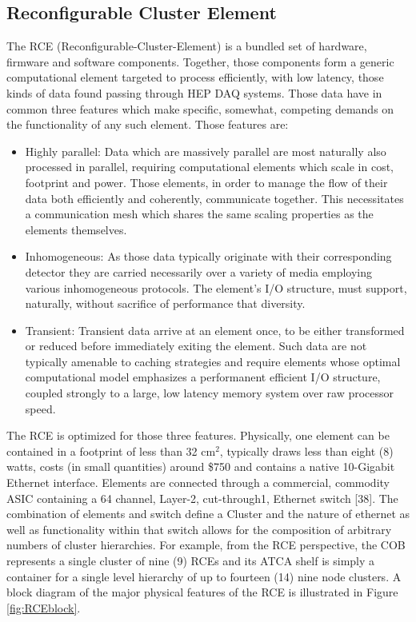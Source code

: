 \subsection{Reconfigurable Cluster Element}
\label{sec:RCE}
The RCE (Reconfigurable-Cluster-Element) is a bundled set of hardware, firmware and software components. Together, those components form a generic computational element targeted to process efficiently, with low latency, those kinds of data found passing through HEP DAQ systems. Those data have in common three features which make specific, somewhat, competing demands on the functionality of any such element. Those features are:
\begin{itemize}
\item Highly parallel: Data which are massively parallel are most naturally also processed in parallel, requiring computational elements which scale in cost,   footprint and power. Those elements, in order to manage the flow of their data both efficiently and coherently, communicate together. This necessitates a communication mesh which shares the same scaling properties as the elements themselves.
\item Inhomogeneous: As those data typically originate with their corresponding detector they are carried necessarily over a variety of media employing various inhomogeneous protocols. The element's I/O structure, must support, naturally, without sacrifice of performance that diversity.
\item Transient:
Transient data arrive at an element once, to be either transformed or reduced before immediately exiting the element. Such data are not typically amenable to caching strategies and require elements whose optimal computational model emphasizes a performanent efficient I/O structure, coupled strongly to a large, low latency memory system over raw processor speed.
\end{itemize}
The RCE is optimized for those three features. Physically, one element can be contained in a footprint of less than 32 cm$^2$, typically draws less than eight (8) watts, costs (in small quantities) around \$750 and contains a native 10-Gigabit Ethernet interface. Elements are connected through a commercial, commodity ASIC containing a 64 channel, Layer-2, cut-through1, Ethernet switch [38]. The combination of elements and switch define a Cluster and the nature of ethernet as well as functionality within that switch allows for the composition of arbitrary numbers of cluster hierarchies. For example, from the RCE perspective, the COB represents a single cluster of nine (9) RCEs and its ATCA shelf is simply a container for a single level hierarchy of up to fourteen (14) nine node clusters. A block diagram of the major physical features of the RCE is illustrated in Figure \ref{fig:RCEblock}.


